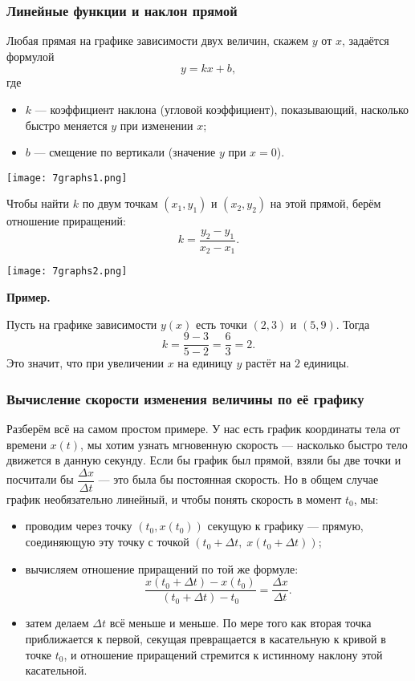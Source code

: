 \documentclass[12pt, a4paper]{article}%
\begin{document}
\subsubsection*{Линейные функции и наклон прямой}
Любая прямая на графике зависимости двух величин, скажем $y$ от $x$, задаётся формулой
\[
y = kx + b,
\]
где
\begin{itemize}
  \item $k$ — коэффициент наклона (угловой коэффициент), показывающий, насколько быстро меняется $y$ при изменении $x$;
  \item $b$ — смещение по вертикали (значение $y$ при $x=0$).
\end{itemize}


\begin{center}
\texttt{[image: 7graphs1.png]}
\label{fig:mpr}
\end{center}


Чтобы найти $k$ по двум точкам $(x_1,y_1)$ и $(x_2,y_2)$ на этой прямой, берём отношение приращений:
\[
k = \frac{y_2 - y_1}{x_2 - x_1}.
\]

\begin{center}
\texttt{[image: 7graphs2.png]}
\label{fig:mpr}
\end{center}

\textbf{Пример.}

Пусть на графике зависимости $y(x)$ есть точки $(2,3)$ и $(5,9)$. Тогда
\[
k = \frac{9 - 3}{5 - 2} = \frac{6}{3} = 2.
\]
Это значит, что при увеличении $x$ на единицу $y$ растёт на $2$ единицы.

\subsubsection*{Вычисление скорости изменения величины по её графику}

Разберём всё на самом простом примере. У нас есть график координаты тела от времени $x(t)$, мы хотим узнать
мгновенную скорость — насколько быстро тело движется в данную секунду. Если бы график был прямой, взяли
бы две точки и посчитали бы $\dfrac{\Delta x}{\Delta t}$ — это была бы постоянная скорость. Но в общем случае график необязательно линейный, и чтобы понять скорость в момент $t_0$, мы:
\begin{itemize}
  \item проводим через точку $(t_0, x(t_0))$ секущую к графику — прямую, соединяющую эту точку с точкой $(t_0 + \Delta t,\; x(t_0+\Delta t))$;
  \item вычисляем отношение приращений по той же формуле:
  \[
    \frac{x(t_0+\Delta t) - x(t_0)}{(t_0 + \Delta t) - t_0}
    = \frac{\Delta x}{\Delta t}.
  \]
  \item затем делаем $\Delta t$ всё меньше и меньше. По мере того как вторая точка приближается к первой, секущая превращается в касательную к кривой в точке $t_0$, и отношение приращений стремится к истинному наклону этой касательной.
\end{itemize}
\end{document}
